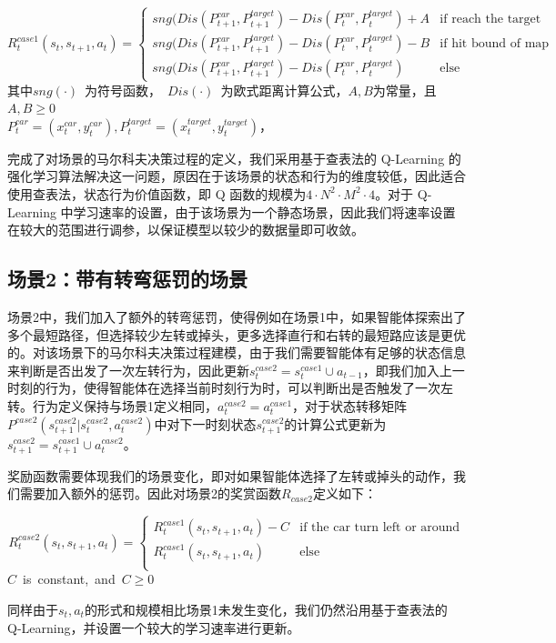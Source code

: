 \documentclass{standalone}
\begin{document}
\begin{center}
    \begin{equation}
    \label{rewardcase1}
    R_t^{case1}(s_t, s_{t+1}, a_t) = \begin{cases}
     sng(Dis(P_{t+1}^{car}, P_{t+1}^{target}) - Dis(P_{t}^{car}, P_{t}^{target}) + A &\mbox{if reach the target}\\
     sng(Dis(P_{t+1}^{car}, P_{t+1}^{target}) - Dis(P_{t}^{car}, P_{t}^{target}) - B &\mbox{if hit bound of map}\\
     sng(Dis(P_{t+1}^{car}, P_{t+1}^{target}) - Dis(P_{t}^{car}, P_{t}^{target}) &\mbox{else}
     \end{cases}
    \end{equation}
    \mbox{其中$sng(\cdot)$ 为符号函数， $Dis(\cdot)$ 为欧式距离计算公式，$A,B$为常量，且$A, B \geq 0$}\\
    \mbox{$P_{t}^{car} = (x_t^{car}, y_t^{car}), P_{t}^{target} = (x^{target}_t, y^{target}_t)$，}
\end{center}

完成了对场景的马尔科夫决策过程的定义，我们采用基于查表法的 Q-Learning 的强化学习算法解决这一问题，原因在于该场景的状态和行为的维度较低，因此适合使用查表法，状态行为价值函数，即 Q 函数的规模为$4\cdot N^2\cdot M^2 \cdot 4$。对于 Q-Learning 中学习速率的设置，由于该场景为一个静态场景，因此我们将速率设置在较大的范围进行调参，以保证模型以较少的数据量即可收敛。
\subsection{场景2：带有转弯惩罚的场景}
场景2中，我们加入了额外的转弯惩罚，使得例如在场景1中，如果智能体探索出了多个最短路径，但选择较少左转或掉头，更多选择直行和右转的最短路应该是更优的。对该场景下的马尔科夫决策过程建模，由于我们需要智能体有足够的状态信息来判断是否出发了一次左转行为，因此更新$s_t^{case2}=s_t^{case1}\cup a_{t-1}$，即我们加入上一时刻的行为，使得智能体在选择当前时刻行为时，可以判断出是否触发了一次左转。行为定义保持与场景1定义相同，$a_t^{case2} = a_t^{case1}$，对于状态转移矩阵$P^{case2}(s_{t+1}^{case2}|s_t^{case2}, a_t^{case2})$中对下一时刻状态$s_{t+1}^{case2}$的计算公式更新为$s_{t+1}^{case2} = s_{t+1}^{case1} \cup a_t^{case2}$。\par
奖励函数需要体现我们的场景变化，即对如果智能体选择了左转或掉头的动作，我们需要加入额外的惩罚。因此对场景2的奖赏函数$R_{case2}$定义如下：
\begin{center}
    \begin{equation}
    \label{eq2reward}
    R_t^{case2}(s_t, s_{t+1}, a_t) = \begin{cases}
     R_t^{case1}(s_t, s_{t+1}, a_t) - C &\mbox{if the car turn left or around}\\
     R_t^{case1}(s_t, s_{t+1}, a_t) &\mbox{else}\\
     \end{cases}
    \end{equation}
   \mbox{$C$ is constant, and $C \geq 0$}

\end{center}
同样由于$s_t, a_t$的形式和规模相比场景1未发生变化，我们仍然沿用基于查表法的 Q-Learning，并设置一个较大的学习速率进行更新。
\end{document}
